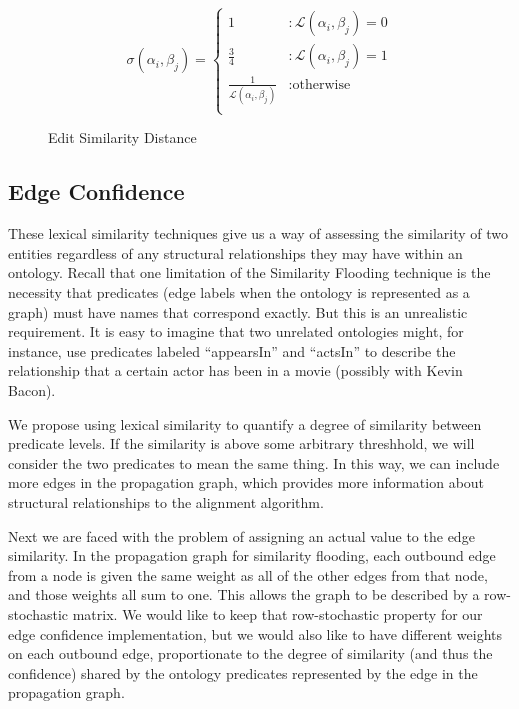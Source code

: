 \documentclass[letterpaper,twocolumn,12pt]{article}
\begin{document}
\begin{figure*}
\centering
\begin{equation*}
\sigma
\left( \alpha_i, \beta_j \right) = \left\{
\begin{array}{ll}
  1           &: \mathcal{L} \left( \alpha_i, \beta_j \right) = 0 \\
  \frac{3}{4} &: \mathcal{L} \left( \alpha_i, \beta_j \right) = 1 \\
  \frac{1}{\mathcal{L} \left( \alpha_i, \beta_j \right)} &: \text{otherwise} \\
\end{array}
\right.
\end{equation*}
\caption{Edit Similarity Distance}
\end{figure*}

\subsection{Edge Confidence}
These lexical similarity techniques give us a way of assessing the 
similarity of two entities regardless of any structural relationships
they may have within an ontology. Recall that one limitation of the
Similarity Flooding technique is the necessity that predicates 
(edge labels when the ontology is represented as a graph) must have
names that correspond exactly. But this is an unrealistic requirement. 
It is easy to imagine that two unrelated ontologies might, for instance,
use predicates labeled ``appearsIn'' and ``actsIn'' to describe the
relationship that a certain actor has been in a movie (possibly with
Kevin Bacon).

We propose using lexical similarity to quantify a degree of similarity
between predicate levels. If the similarity is above some arbitrary
threshhold, we will consider the two predicates to mean the same thing.
In this way, we can include more edges in the propagation graph,
which provides more information about structural relationships to
the alignment algorithm.

Next we are faced with the problem of assigning an actual value to the
edge similarity. In the propagation graph for similarity flooding, each
outbound edge from a node is given the same weight as all of the other
edges from that node, and those weights all sum to one. This allows the 
graph to be described by a row-stochastic matrix. We would like to keep
that row-stochastic property for our edge confidence implementation, but 
we would also like to have different weights on each outbound edge,
proportionate to the degree of similarity (and thus the confidence) shared
by the ontology predicates represented by the edge in the propagation graph.
\end{document}
